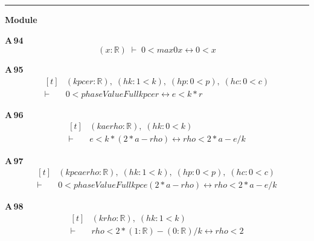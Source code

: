 \vspace{4pt}\noindent\rule{\columnwidth}{0.4pt}\par\vspace{2pt}
\noindent\textbf{Module }\par\vspace{3pt}

\noindent\textbf{A\,94}\quad{}
{\footnotesize\[ (\mathit{x} : \mathbb{R} ) \;\vdash\; 0 < \mathit{max} 0 \mathit{x} \leftrightarrow 0 < \mathit{x} \]}

\noindent\textbf{A\,95}\quad{}
{\footnotesize\[ \begin{aligned}[t]
&(\mathit{k} \mathit{p} \mathit{c} \mathit{e} \mathit{r} : \mathbb{R} ),\; (\mathit{hk} : 1 < \mathit{k}),\; (\mathit{hp} : 0 < \mathit{p}),\; (\mathit{hc} : 0 < \mathit{c})\\
\vdash\;&0 < \mathit{phaseValueFull} \mathit{k} \mathit{p} \mathit{c} \mathit{e} \mathit{r} \leftrightarrow \mathit{e} < \mathit{k}*\mathit{r}
\end{aligned} \]}

\noindent\textbf{A\,96}\quad{}
{\footnotesize\[ \begin{aligned}[t]
&(\mathit{k} \mathit{a} \mathit{e} \mathit{rho} : \mathbb{R} ),\; (\mathit{hk} : 0 < \mathit{k})\\
\vdash\;&\mathit{e} < \mathit{k}*(2*\mathit{a}-\mathit{rho}) \leftrightarrow \mathit{rho} < 2*\mathit{a}-\mathit{e}/\mathit{k}
\end{aligned} \]}

\noindent\textbf{A\,97}\quad{}
{\footnotesize\[ \begin{aligned}[t]
&(\mathit{k} \mathit{p} \mathit{c} \mathit{a} \mathit{e} \mathit{rho} : \mathbb{R} ),\; (\mathit{hk} : 1 < \mathit{k}),\; (\mathit{hp} : 0 < \mathit{p}),\; (\mathit{hc} : 0 < \mathit{c})\\
\vdash\;&0 < \mathit{phaseValueFull} \mathit{k} \mathit{p} \mathit{c} \mathit{e} (2*\mathit{a}-\mathit{rho}) \leftrightarrow \mathit{rho} < 2*\mathit{a}-\mathit{e}/\mathit{k}
\end{aligned} \]}

\noindent\textbf{A\,98}\quad{}
{\footnotesize\[ \begin{aligned}[t]
&(\mathit{k} \mathit{rho} : \mathbb{R} ),\; (\mathit{hk} : 1 < \mathit{k})\\
\vdash\;&\mathit{rho} < 2*(1:\mathbb{R} )-(0:\mathbb{R} )/\mathit{k} \leftrightarrow \mathit{rho} < 2
\end{aligned} \]}

